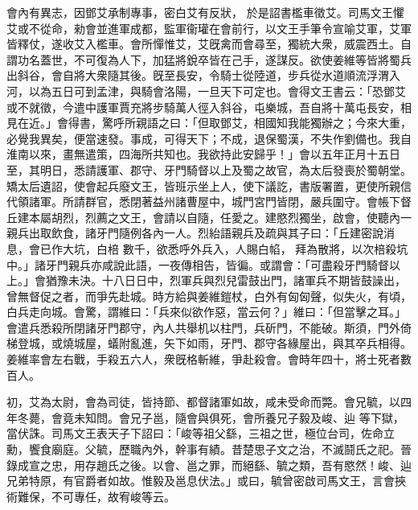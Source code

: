 \begin{pinyinscope}
 
會內有異志，因鄧艾承制專事，密白艾有反狀，
 於是詔書檻車徵艾。司馬文王懼艾或不從命，勑會並進軍成都，監軍衞瓘在會前行，以文王手筆令宣喻艾軍，艾軍皆釋仗，遂收艾入檻車。會所憚惟艾，艾旣禽而會尋至，獨統大衆，威震西土。自謂功名蓋世，不可復為人下，加猛將銳卒皆在己手，遂謀反。欲使姜維等皆將蜀兵出斜谷，會自將大衆隨其後。旣至長安，令騎士從陸道，步兵從水道順流浮渭入河，以為五日可到孟津，與騎會洛陽，一旦天下可定也。會得文王書云：「恐鄧艾或不就徵，今遣中護軍賈充將步騎萬人徑入斜谷，屯樂城，吾自將十萬屯長安，相見在近。」會得書，驚呼所親語之曰：「但取鄧艾，相國知我能獨辦之；今來大重，必覺我異矣，便當速發。事成，可得天下；不成，退保蜀漢，不失作劉備也。我自淮南以來，畫無遣策，四海所共知也。我欲持此安歸乎！」會以五年正月十五日至，其明日，悉請護軍、郡守、牙門騎督以上及蜀之故官，為太后發喪於蜀朝堂。矯太后遺詔，使會起兵廢文王，皆班示坐上人，使下議訖，書版署置，更使所親信代領諸軍。所請群官，悉閉著益州諸曹屋中，城門宮門皆閉，嚴兵圍守。會帳下督丘建本屬胡烈，烈薦之文王，會請以自隨，任愛之。建愍烈獨坐，啟會，使聽內一親兵出取飲食，諸牙門隨例各內一人。烈紿語親兵及疏與其子曰：「丘建密說消息，會已作大坑，白棓
 數千，欲悉呼外兵入，人賜白㡊，
 拜為散將，以次棓殺坑中。」諸牙門親兵亦咸說此語，一夜傳相告，皆徧。或謂會：「可盡殺牙門騎督以上。」會猶豫未決。十八日日中，烈軍兵與烈兒雷鼓出門，諸軍兵不期皆鼓譟出，曾無督促之者，而爭先赴城。時方給與姜維鎧杖，白外有匈匈聲，似失火，有頃，白兵走向城。會驚，謂維曰：「兵來似欲作惡，當云何？」維曰：「但當擊之耳。」會遣兵悉殺所閉諸牙門郡守，內人共舉机以柱門，兵斫門，不能破。斯須，門外倚梯登城，或燒城屋，蟻附亂進，矢下如雨，牙門、郡守各緣屋出，與其卒兵相得。姜維率會左右戰，手殺五六人，衆旣格斬維，爭赴殺會。會時年四十，將士死者數百人。
 
 
初，艾為太尉，會為司徒，皆持節、都督諸軍如故，咸未受命而斃。會兄毓，以四年冬薨，會竟未知問。會兄子邕，隨會與俱死，會所養兄子毅及峻、辿
 等下獄，當伏誅。司馬文王表天子下詔曰：「峻等祖父繇，三祖之世，極位台司，佐命立勳，饗食廟庭。父毓，歷職內外，幹事有績。昔楚思子文之治，不滅鬪氏之祀。晉錄成宣之忠，用存趙氏之後。以會、邕之罪，而絕繇、毓之類，吾有愍然！峻、辿兄弟特原，有官爵者如故。惟毅及邕息伏法。」或曰，毓曾密啟司馬文王，言會挾術難保，不可專任，故宥峻等云。
 

\end{pinyinscope}
